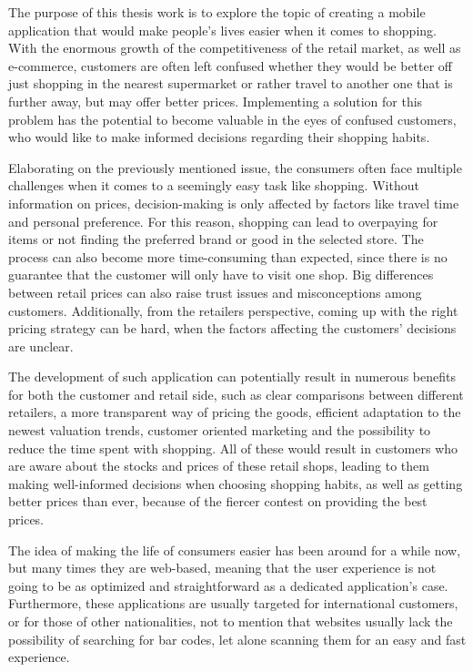 The purpose of this thesis work is to explore the topic of creating a mobile application that would make people's lives easier when it comes to shopping. With the enormous growth of the competitiveness of the retail market, as well as e-commerce, customers are often left confused whether they would be better off just shopping in the nearest supermarket or rather travel to another one that is further away, but may offer better prices. Implementing a solution for this problem has the potential to become valuable in the eyes of confused customers, who would like to make informed decisions regarding their shopping habits.

Elaborating on the previously mentioned issue, the consumers often face multiple challenges when it comes to a seemingly easy task like shopping. Without information on prices, decision-making is only affected by factors like travel time and personal preference. For this reason, shopping can lead to overpaying for items or not finding the preferred brand or good in the selected store. The process can also become more time-consuming than expected, since there is no guarantee that the customer will only have to visit one shop. Big differences between retail prices can also raise trust issues and misconceptions among customers. Additionally, from the retailers perspective, coming up with the right pricing strategy can be hard, when the factors affecting the customers' decisions are unclear.

The development of such application can potentially result in numerous benefits for both the customer and retail side, such as clear comparisons between different retailers, a more transparent way of pricing the goods, efficient adaptation to the newest valuation trends, customer oriented marketing and the possibility to reduce the time spent with shopping. All of these would result in customers who are aware about the stocks and prices of these retail shops, leading to them making well-informed decisions when choosing shopping habits, as well as getting better prices than ever, because of the fiercer contest on providing the best prices.

The idea of making the life of consumers easier has been around for a while now, but many times they are web-based, meaning that the user experience is not going to be as optimized and straightforward as a dedicated application's case. Furthermore, these applications are usually targeted for international customers, or for those of other nationalities, not to mention that websites usually lack the possibility of searching for bar codes, let alone scanning them for an easy and fast experience.

